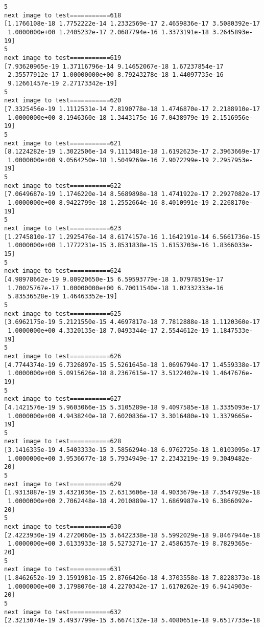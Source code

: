 \documentclass[11pt]{article}
\begin{document}
\begin{Verbatim}[commandchars=\\\{\}]
5
next image to test===========618
[1.1766108e-18 1.7752222e-14 1.2332569e-17 2.4659836e-17 3.5080392e-17
 1.0000000e+00 1.2405232e-17 2.0687794e-16 1.3373191e-18 3.2645893e-19]
5
next image to test===========619
[7.93620965e-19 1.37116796e-14 9.14652067e-18 1.67237854e-17
 2.35577912e-17 1.00000000e+00 8.79243278e-18 1.44097735e-16
 9.12661457e-19 2.27173342e-19]
5
next image to test===========620
[7.3325456e-19 1.1112531e-14 7.8190778e-18 1.4746870e-17 2.2188910e-17
 1.0000000e+00 8.1946360e-18 1.3443175e-16 7.0438979e-19 2.1516956e-19]
5
next image to test===========621
[8.1224282e-19 1.3022506e-14 9.1113481e-18 1.6192623e-17 2.3963669e-17
 1.0000000e+00 9.0564250e-18 1.5049269e-16 7.9072299e-19 2.2957953e-19]
5
next image to test===========622
[7.0649687e-19 1.1746220e-14 8.5689898e-18 1.4741922e-17 2.2927082e-17
 1.0000000e+00 8.9422799e-18 1.2552664e-16 8.4010991e-19 2.2268170e-19]
5
next image to test===========623
[1.2745810e-17 1.2925476e-14 8.6174157e-16 1.1642191e-14 6.5661736e-15
 1.0000000e+00 1.1772231e-15 3.8531838e-15 1.6153703e-16 1.8366033e-15]
5
next image to test===========624
[4.98978662e-19 9.80920650e-15 6.59593779e-18 1.07978519e-17
 1.70025767e-17 1.00000000e+00 6.70011540e-18 1.02332333e-16
 5.83536528e-19 1.46463352e-19]
5
next image to test===========625
[3.6962175e-19 5.2121550e-15 4.4697817e-18 7.7812888e-18 1.1120360e-17
 1.0000000e+00 4.3320135e-18 7.0493344e-17 2.5544612e-19 1.1847533e-19]
5
next image to test===========626
[4.7744374e-19 6.7326897e-15 5.5261645e-18 1.0696794e-17 1.4559338e-17
 1.0000000e+00 5.0915626e-18 8.2367615e-17 3.5122402e-19 1.4647676e-19]
5
next image to test===========627
[4.1421576e-19 5.9603066e-15 5.3105289e-18 9.4097585e-18 1.3335093e-17
 1.0000000e+00 4.9438240e-18 7.6020836e-17 3.3016480e-19 1.3379665e-19]
5
next image to test===========628
[3.1416335e-19 4.5403333e-15 3.5856294e-18 6.9762725e-18 1.0103095e-17
 1.0000000e+00 3.9536677e-18 5.7934949e-17 2.2343219e-19 9.3049482e-20]
5
next image to test===========629
[1.9313887e-19 3.4321036e-15 2.6313606e-18 4.9033679e-18 7.3547929e-18
 1.0000000e+00 2.7062448e-18 4.2010889e-17 1.6869987e-19 6.3866092e-20]
5
next image to test===========630
[2.4223930e-19 4.2720060e-15 3.6422338e-18 5.5992029e-18 9.8467944e-18
 1.0000000e+00 3.6133933e-18 5.5273271e-17 2.4586357e-19 8.7829365e-20]
5
next image to test===========631
[1.8462652e-19 3.1591981e-15 2.8766426e-18 4.3703558e-18 7.8228373e-18
 1.0000000e+00 3.1798076e-18 4.2270342e-17 1.6170262e-19 6.9414903e-20]
5
next image to test===========632
[2.3213074e-19 3.4937799e-15 3.6674132e-18 5.4080651e-18 9.6517733e-18

\end{Verbatim}
\end{document}
